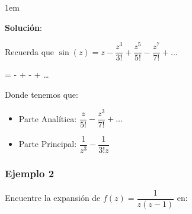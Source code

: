 \documentclass[12pt, fleqn]{report}                             %
\newenvironment{SmallIndentation}[1][0.75em]                    %
        {\begin{adjustwidth}{#1}{}\begin{footnotesize}}             %
        {\end{footnotesize}\end{adjustwidth}}                       %
\def \Eq {equation}                                             %
\newenvironment{MultiLineEquation*}[1]                          %
        {\begin{\Eq*}\begin{alignedat}{#1}}                         %
        {\end{alignedat}\end{\Eq*}}                                 %
\theoremstyle{break}                                            %
\newcommand{\Wrap}[1]           {\left( #1 \right)}             %
\newcommand{\Sin}[1] {\sin\Wrap{#1}}                            %
\begin{document}
                    \begin{SmallIndentation}[1em]
                        \textbf{Solución}:
                        
                        Recuerda que $\Sin{z} = z - \dfrac{z^3}{3!} + \dfrac{z^5}{5!} - 
                        \dfrac{z^7}{7!} + \dots$

                        \begin{MultiLineEquation*}{3}
                            \dfrac{\Sin{z}}{z^4} =  -  + 
                             -  + \dots
                        \end{MultiLineEquation*}

                        Donde tenemos que:
                        \begin{itemize}
                            \item Parte Analítica: $\dfrac{z}{5!} - \dfrac{z^3}{7!} + \dots$
                            \item Parte Principal: $\dfrac{1}{z^3} - \dfrac{1}{3!z}$
                        \end{itemize}
                            
                    \end{SmallIndentation}


                \subsubsection{Ejemplo 2}

                    Encuentre la expansión de $f(z) = \dfrac{1}{z(z-1)}$ en:
\end{document}
